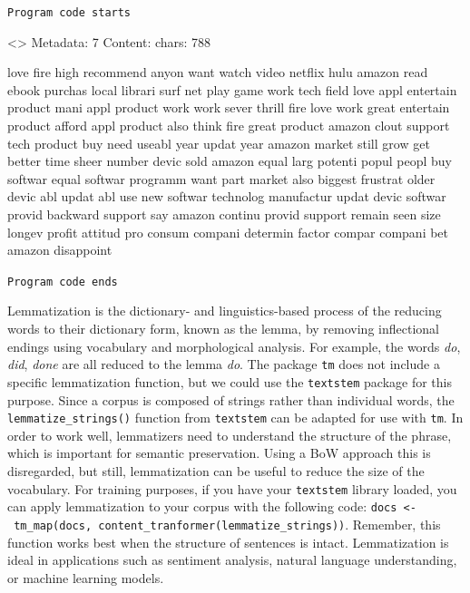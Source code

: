 \texttt{Program\ code\ starts}

\begin{Shaded}
\begin{Highlighting}[]

\OtherTok{\textless{}{-}} 

\NormalTok{(docs[[}\NormalTok{]])}
\end{Highlighting}
\end{Shaded}

\textless{}\textgreater{} Metadata: 7 Content: chars: 788

love fire high recommend anyon want watch video netflix hulu amazon read
ebook purchas local librari surf net play game work tech field love appl
entertain product mani appl product work work sever thrill fire love
work great entertain product afford appl product also think fire great
product amazon clout support tech product buy need useabl year updat
year amazon market still grow get better time sheer number devic sold
amazon equal larg potenti popul peopl buy softwar equal softwar programm
want part market also biggest frustrat older devic abl updat abl use new
softwar technolog manufactur updat devic softwar provid backward support
say amazon continu provid support remain seen size longev profit attitud
pro consum compani determin factor compar compani bet amazon disappoint

\texttt{Program\ code\ ends}

Lemmatization is the dictionary- and linguistics-based process of the
reducing words to their dictionary form, known as the lemma, by removing
inflectional endings using vocabulary and morphological analysis. For
example, the words \emph{do}, \emph{did}, \emph{done} are all reduced to
the lemma \emph{do}. The package \texttt{tm} does not include a specific
lemmatization function, but we could use the \texttt{textstem} package
for this purpose. Since a corpus is composed of strings rather than
individual words, the \texttt{lemmatize\_strings()} function from
\texttt{textstem} can be adapted for use with \texttt{tm}. In order to work well, lemmatizers need to understand the structure of the phrase, which is important for semantic preservation. Using a BoW approach this
is disregarded, but still, lemmatization can be useful to reduce the
size of the vocabulary. For training purposes, if you have your
\texttt{textstem} library loaded, you can apply lemmatization to your
corpus with the following code:
\texttt{docs\ \textless{}-\ tm\_map(docs,\ content\_tranformer(lemmatize\_strings))}.
Remember, this function works best when the structure of sentences is
intact. Lemmatization is ideal in applications such as sentiment
analysis, natural language understanding, or machine learning models.

